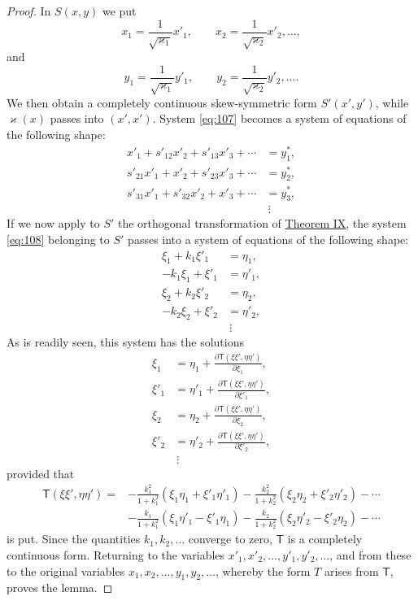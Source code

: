 \documentclass[b5paper,twoside]{article}
\newcommand{\originalpage}[1]{\phantomsection\label{origpage:#1}}
\begin{document}
\begin{proof}
In $S(x,y)$ we put
\[
  x_1=\frac{1}{\sqrt{\varkappa_1}}x'_1,
  \qquad
  x_2=\frac{1}{\sqrt{\varkappa_2}}x'_2,\ldots,
\]
and
\[
  y_1=\frac{1}{\sqrt{\varkappa_1}}y'_1,
  \qquad
  y_2=\frac{1}{\sqrt{\varkappa_2}}y'_2,\ldots.
\]
We then obtain a completely continuous skew-symmetric form $S'(x',y')$,
while $\varkappa(x)$ passes into $(x',x')$. System \eqref{eq:107} becomes
a system of equations of the following shape:
\begin{equation}
  \begin{aligned}
    x'_1+s'_{12}x'_2+s'_{13}x'_3+\cdots&=y_1^*,\\
    s'_{21}x'_1+x'_2+s'_{23}x'_3+\cdots&=y_2^*,\\
    s'_{31}x'_1+s'_{32}x'_2+x'_3+\cdots&=y_3^*,\\
    &\ \vdots
  \end{aligned}
  \tag{108}\label{eq:108}
\end{equation}
If we now apply to $S'$ the orthogonal transformation of
\hyperref[thm:IX]{Theorem IX}, the system \eqref{eq:108} belonging to $S'$
passes into a system of equations of the following shape:
\begin{align*}
  \xi_1+k_1\xi'_1&=\eta_1,\\
  -k_1\xi_1+\xi'_1&=\eta'_1,\\
  \xi_2+k_2\xi'_2&=\eta_2,\\
  -k_2\xi_2+\xi'_2&=\eta'_2,\\
  &\ \vdots
\end{align*}
As is readily seen, this system has the solutions
\begin{align*}
  \xi_1&=\eta_1+
  \frac{\partial \mathsf T(\xi\xi',\eta\eta')}{\partial\xi_1},\\
  \xi'_1&=\eta'_1+
  \frac{\partial \mathsf T(\xi\xi',\eta\eta')}{\partial\xi'_1},\\
  \xi_2&=\eta_2+
  \frac{\partial \mathsf T(\xi\xi',\eta\eta')}{\partial\xi_2},\\
  \xi'_2&=\eta'_2+
  \frac{\partial \mathsf T(\xi\xi',\eta\eta')}{\partial\xi'_2},\\
  &\ \vdots
\end{align*}
\originalpage{225}
provided that
\begin{align*}
  \mathsf T(\xi\xi',\eta\eta')
  ={}&-\frac{k_1^2}{1+k_1^2}(\xi_1\eta_1+\xi'_1\eta'_1)
      -\frac{k_2^2}{1+k_2^2}(\xi_2\eta_2+\xi'_2\eta'_2)-\cdots\\
    &-\frac{k_1}{1+k_1^2}(\xi_1\eta'_1-\xi'_1\eta_1)
      -\frac{k_2}{1+k_2^2}(\xi_2\eta'_2-\xi'_2\eta_2)-\cdots
\end{align*}
is put. Since the quantities $k_1,k_2,\ldots$ converge to zero, $\mathsf T$ is a
completely continuous form. Returning to the variables
$x'_1,x'_2,\ldots,y'_1,y'_2,\ldots$, and from these to the original variables
$x_1,x_2,\ldots,y_1,y_2,\ldots$, whereby the form $T$ arises from
$\mathsf T$, proves the lemma.
\end{proof}
\end{document}
